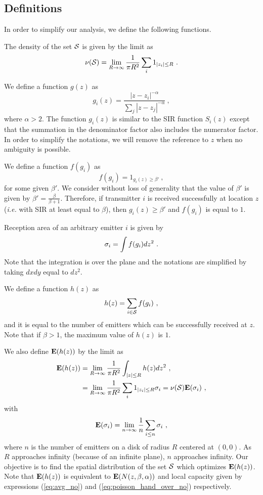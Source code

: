 \documentclass[12pt,english]{article}
\begin{document}
\subsection{Definitions}

In order to simplify our analysis, we define the following functions.
\begin{compactenum}

\item The density of the set ${\cal S}$ is given by the limit as
$$
\nu({\cal S})=\lim_{R\to\infty}\frac{1}{\pi R^2}\sum_i 1_{|z_i|\le R}~.
$$
\item We define a function $g(z)$ as
$$
g_i(z)=\frac{|z-z_i|^{-\alpha}}{\sum_{j}|z-z_j|^{-\alpha}}~,
$$ 
where \mbox{$\alpha>2$}. The function $g_i(z)$ is similar to the SIR function $S_i(z)$ except that the summation in the denominator factor also includes the numerator factor. In order to simplify the notations, we will remove the reference to $z$ when no ambiguity is possible. 
\item We define a function $f(g_i)$ as 
$$
f(g_i)=1_{g_i(z)\geq \beta'}~,
$$ 
for some given $\beta'$. We consider without loss of generality that the value of $\beta'$ is given by \mbox{$\beta'=\frac{\beta}{\beta+1}$}. Therefore, if transmitter $i$ is received successfully at location $z$ ({\it i.e.} with SIR at least equal to $\beta$), then \mbox{$g_i(z)\geq \beta'$} and $f(g_i)$ is equal to $1$.
\item Reception area of an arbitrary emitter $i$ is given by 
$$
\ss_i=\int f(g_i)dz^2~.
$$
Note that the integration is over the plane and the notations are simplified by taking $dxdy$ equal to $dz^2$. 
\item We define a function $h(z)$ as
$$
h(z)=\sum_{i\in {\cal S}}{f(g_i)}~,
$$ 
and it is equal to the number of emitters which can be successfully received at $z$. Note that if \mbox{$\beta>1$}, the maximum value of $h(z)$ is $1$. 
\item We also define $\E(h(z))$ by the limit as
\begin{align*}
\E(h(z))&=\lim_{R\to\infty}\frac{1}{\pi R^2}\int_{|z|\le R}h(z)dz^2~,\\
&=\lim_{R\to\infty}\frac{1}{\pi R^2}\sum_i 1_{|z_i|\le R}\ss_i=\nu({\cal S})\E(\ss_i)~,
\end{align*}
with
$$
\E(\ss_i)=\lim_{n\to\infty}\frac{1}{n}\sum_{i\le n}\ss_i~,
$$
where $n$ is the number of emitters on a disk of radius $R$ centered at $(0,0)$. As $R$ approaches infinity (because of an infinite plane), $n$ approaches infinity. Our objective is to find the spatial distribution of the set ${\cal S}$ which optimizes $\E(h(z))$. Note that $\E(h(z))$ is equivalent to $\E(N(z,\beta,\alpha))$ and local capacity given by expressions (\ref{eq:avg_no}) and (\ref{eq:poisson_hand_over_no}) respectively. 
\end{compactenum}
\end{document}
